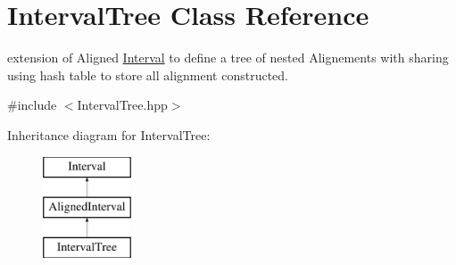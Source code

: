 \hypertarget{classIntervalTree}{}\section{Interval\+Tree Class Reference}
\label{classIntervalTree}


extension of Aligned \mbox{\hyperlink{classInterval}{Interval}} to define a tree of nested Alignements with sharing using hash table to store all alignment constructed.  




{\ttfamily \#include $<$Interval\+Tree.\+hpp$>$}

Inheritance diagram for Interval\+Tree\+:\begin{figure}[H]
\begin{center}
\leavevmode
\includegraphics[height=3.000000cm]{classIntervalTree}
\end{center}
\end{figure}
